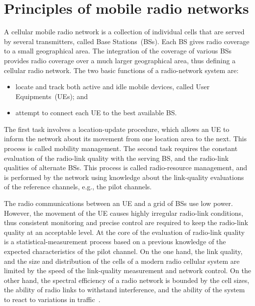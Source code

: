 \chapter{Principles of mobile radio networks \label{chap:02-Principles_of_mobile_radio_networks}}

A cellular mobile radio network is a collection of individual cells
that are served by several transmitters, called Base Stations~(BSs).
Each BS gives radio coverage to a small geographical area. The integration
of the coverage of various BSs provides radio coverage over a much
larger geographical area, thus defining a cellular radio network.
The two basic functions of a radio-network system are: 
\begin{itemize}
\item locate and track both active and idle mobile devices, called User
Equipments~(UEs); and
\item attempt to connect each UE to the best available BS.
\end{itemize}
The first task involves a location-update procedure, which allows
an UE to inform the network about its movement from one location area
to the next. This process is called mobility management. The second
task requires the constant evaluation of the radio-link quality with
the serving BS, and the radio-link qualities of alternate BSs. This
process is called radio-resource management, and is performed by the
network using knowledge about the link-quality evaluations of the
reference channels, e.g., the pilot channels.

The radio communications between an UE and a grid of BSs use low power.
However, the movement of the UE causes highly irregular radio-link
conditions, thus consistent monitoring and precise control are required
to keep the radio-link quality at an acceptable level. At the core
of the evaluation of radio-link quality is a statistical-measurement
process based on a previous knowledge of the expected characteristics
of the pilot channel. On the one hand, the link quality, and the size
and distribution of the cells of a modern radio cellular system are
limited by the speed of the link-quality measurement and network control.
On the other hand, the spectral efficiency of a radio network is bounded
by the cell sizes, the ability of radio links to withstand interference,
and the ability of the system to react to variations in traffic~\cite{Stuber-Principles_of_mobile_communication:2011}.

